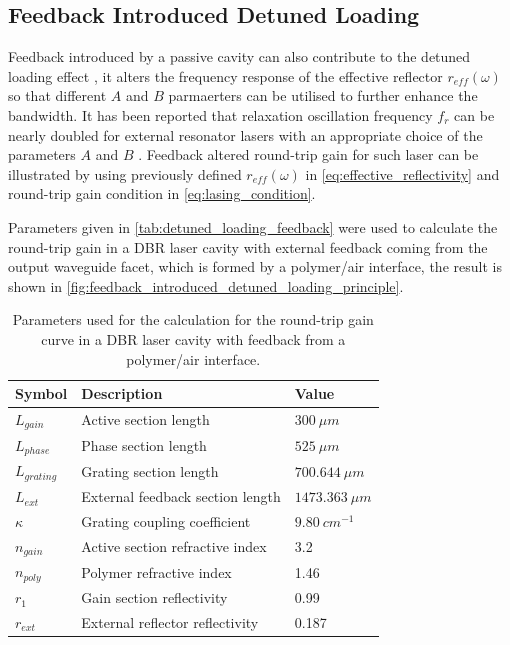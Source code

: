 \subsection{Feedback Introduced Detuned Loading}\label{subsec:feedback_introduced_detuned_loading}
Feedback introduced by a passive cavity can also contribute to the detuned loading effect \cite{vahala1984detuned, vahala1985observation}, it alters the frequency response of the effective reflector $r_{eff}(\omega)$ so that different $A$ and $B$ parmaerters can be utilised to further enhance the bandwidth. It has been reported that relaxation oscillation frequency $f_r$ can be nearly doubled for external resonator lasers with an appropriate choice of the parameters $A$ and $B$ \cite{ vahala1984detuned, agrawal1988modulation, vahala1985observation}. Feedback altered round-trip gain for such laser can be illustrated by using previously defined $r_{eff}(\omega)$ in \autoref{eq:effective_reflectivity} and round-trip gain condition in \autoref{eq:lasing_condition}.

Parameters given in \autoref{tab:detuned_loading_feedback} were used to calculate the round-trip gain in a DBR laser cavity with external feedback coming from the output waveguide facet, which is formed by a polymer/air interface, the result is shown in \autoref{fig:feedback_introduced_detuned_loading_principle}.

\begin{table}[ht]
    \centering
    \caption{Parameters used for the calculation for the round-trip gain curve in a DBR laser cavity with feedback from a polymer/air interface.}
    \label{tab:detuned_loading_feedback}
    \begin{tabular}{@{}lll@{}}
    \toprule
    Symbol          & Description                      & Value             \\ \midrule
    $L_{gain}$      & Active section length            & $300 \ \mu m$     \\
    $L_{phase}$     & Phase section length             & $525 \ \mu m$     \\
    $L_{grating}$   & Grating section length           & $700.644\ \mu m$  \\
    $L_{ext}$       & External feedback section length & $1473.363\ \mu m$ \\
    $\kappa$        & Grating coupling coefficient     & $9.80 \ cm^{-1}$  \\
    $n_{gain}$      & Active section refractive index  & 3.2               \\
    $n_{poly}$      & Polymer refractive index         & 1.46              \\
    $r_1$           & Gain section reflectivity        & 0.99              \\
    $r_{ext}$       & External reflector reflectivity  & 0.187             \\ \bottomrule
    \end{tabular}
\end{table}

